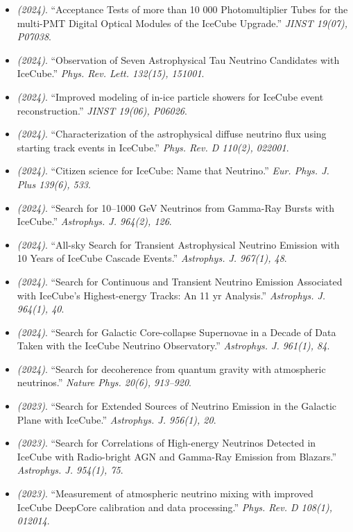 \begin{itemize}
\item \textit{(2024)}. ``Acceptance Tests of more than 10 000 Photomultiplier Tubes for the multi-PMT Digital Optical Modules of the IceCube Upgrade.'' \textit{JINST 19(07), P07038}.  
\item \textit{(2024)}. ``Observation of Seven Astrophysical Tau Neutrino Candidates with IceCube.'' \textit{Phys. Rev. Lett. 132(15), 151001}.  
\item \textit{(2024)}. ``Improved modeling of in-ice particle showers for IceCube event reconstruction.'' \textit{JINST 19(06), P06026}.  
\item \textit{(2024)}. ``Characterization of the astrophysical diffuse neutrino flux using starting track events in IceCube.'' \textit{Phys. Rev. D 110(2), 022001}.  
\item \textit{(2024)}. ``Citizen science for IceCube: Name that Neutrino.'' \textit{Eur. Phys. J. Plus 139(6), 533}.  
\item \textit{(2024)}. ``Search for 10--1000 GeV Neutrinos from Gamma-Ray Bursts with IceCube.'' \textit{Astrophys. J. 964(2), 126}.  
\item \textit{(2024)}. ``All-sky Search for Transient Astrophysical Neutrino Emission with 10 Years of IceCube Cascade Events.'' \textit{Astrophys. J. 967(1), 48}.  
\item \textit{(2024)}. ``Search for Continuous and Transient Neutrino Emission Associated with IceCube's Highest-energy Tracks: An 11 yr Analysis.'' \textit{Astrophys. J. 964(1), 40}.  
\item \textit{(2024)}. ``Search for Galactic Core-collapse Supernovae in a Decade of Data Taken with the IceCube Neutrino Observatory.'' \textit{Astrophys. J. 961(1), 84}.  
\item \textit{(2024)}. ``Search for decoherence from quantum gravity with atmospheric neutrinos.'' \textit{Nature Phys. 20(6), 913--920}.  
\item \textit{(2023)}. ``Search for Extended Sources of Neutrino Emission in the Galactic Plane with IceCube.'' \textit{Astrophys. J. 956(1), 20}.  
\item \textit{(2023)}. ``Search for Correlations of High-energy Neutrinos Detected in IceCube with Radio-bright AGN and Gamma-Ray Emission from Blazars.'' \textit{Astrophys. J. 954(1), 75}.  
\item \textit{(2023)}. ``Measurement of atmospheric neutrino mixing with improved IceCube DeepCore calibration and data processing.'' \textit{Phys. Rev. D 108(1), 012014}.  
\end{itemize}
